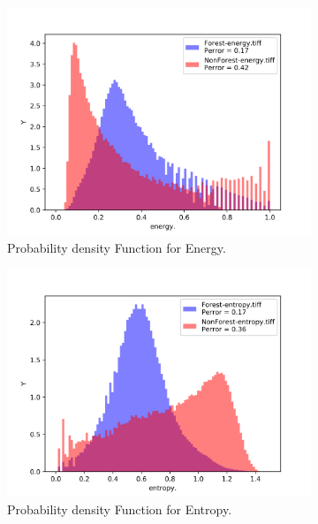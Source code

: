 \begin{figure}[H]
\begin{subfigure}[b]{0.4\linewidth}
    \includegraphics[width=\linewidth]{Chapter4/glcm_textures/energy_hist.png}
     \caption{Probability density Function for Energy.}
  \end{subfigure}
  \centering
  \begin{subfigure}[b]{0.4\linewidth}
    \includegraphics[width=\linewidth]{Chapter4/glcm_textures/entropy_hist.png}
     \caption{Probability density Function for Entropy.}
  \end{subfigure}
  \centering
  \begin{subfigure}[b]{0.4\linewidth}

\end{subfigure}
\end{figure}
